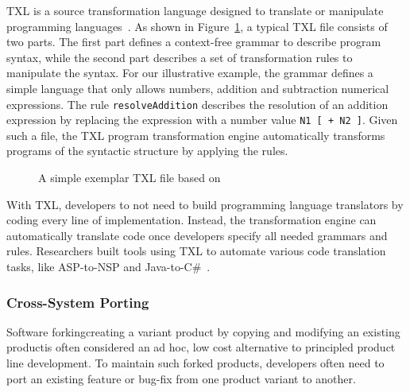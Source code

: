 \documentclass[runningheads,a4paper]{llncs}
\newcommand{\codefont}[1]{\footnotesize{\texttt{#1}}\normalsize}
\begin{document}
TXL is a source transformation language designed to translate or manipulate programming languages~\cite{Cordy2006}. As shown in Figure~\ref{fig:txl}, a typical TXL file consists of two parts. The first part defines a context-free grammar to describe program syntax, while the second part describes a set of transformation rules to manipulate the syntax. For our illustrative example, the grammar defines a simple language that only allows numbers, addition and subtraction numerical expressions. The rule \codefont{resolveAddition} describes the resolution of an addition expression by replacing the expression with a number value \codefont{N1 [ + N2 ]}. Given such a file, the TXL program transformation engine automatically transforms programs of the syntactic structure by applying the rules. 

\begin{figure}
\centering
{}
\caption{A simple exemplar TXL file based on~\cite{txltour}}
\label{fig:txl}
\end{figure}
With TXL, developers to not need to build programming language translators by coding every line of implementation. Instead, the transformation engine can automatically translate code once developers specify all needed grammars and rules. Researchers built tools using TXL to automate various code translation tasks, like ASP-to-NSP and Java-to-C\#~\cite{Chu:08,Hassan:2005,El-Ramly:2006,Tonella:04}.

\subsubsection{Cross-System Porting} 
Software forking\textemdash creating a variant product by copying and modifying an existing product\textemdash is often considered an ad hoc, low cost alternative to principled product line development. To maintain such forked products, developers often need to port an existing feature or bug-fix from one product variant to another. 
\end{document}
